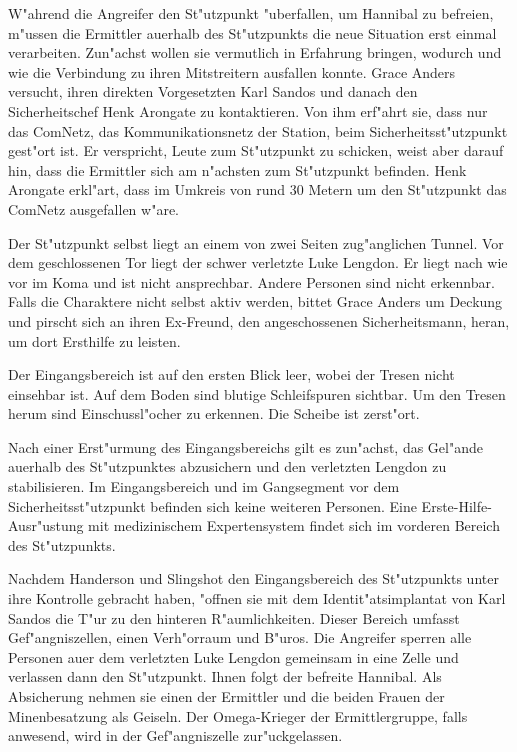 
W"ahrend die Angreifer den St"utzpunkt "uberfallen, um Hannibal zu befreien, m"ussen die Ermittler au\3erhalb des St"utzpunkts die neue Situation erst einmal verarbeiten. Zun"achst wollen sie vermutlich in Erfahrung bringen, wodurch und wie die Verbindung zu ihren Mitstreitern ausfallen konnte. Grace Anders versucht, ihren direkten Vorgesetzten Karl Sandos und danach den Sicherheitschef Henk Arongate zu kontaktieren. Von ihm erf"ahrt sie, dass nur das ComNetz, das Kommunikationsnetz der Station, beim Sicherheitsst"utzpunkt gest"ort ist. Er verspricht, Leute zum St"utzpunkt zu schicken, weist aber darauf hin, dass die Ermittler sich am n"achsten zum St"utzpunkt befinden. Henk Arongate erkl"art, dass im Umkreis von rund 30 Metern um den St"utzpunkt das ComNetz ausgefallen w"are.

Der St"utzpunkt selbst liegt an einem von zwei Seiten zug"anglichen Tunnel. Vor dem geschlossenen Tor liegt der schwer verletzte Luke Lengdon. Er liegt nach wie vor im Koma und ist nicht ansprechbar. Andere Personen sind nicht erkennbar. Falls die Charaktere nicht selbst aktiv werden, bittet Grace Anders um Deckung und pirscht sich an ihren Ex-Freund, den angeschossenen Sicherheitsmann, heran, um dort Ersthilfe zu leisten.

Der Eingangsbereich ist auf den ersten Blick leer, wobei der Tresen nicht einsehbar ist. Auf dem Boden sind blutige Schleifspuren sichtbar. Um den Tresen herum sind Einschussl"ocher zu erkennen. Die Scheibe ist zerst"ort. 

Nach einer Erst"urmung des Eingangsbereichs gilt es zun"achst, das Gel"ande au\3erhalb des St"utzpunktes abzusichern und den verletzten Lengdon zu stabilisieren. Im Eingangsbereich und im Gangsegment vor dem Sicherheitsst"utzpunkt befinden sich keine weiteren Personen. Eine Erste-Hilfe-Ausr"ustung mit medizinischem Expertensystem findet sich im vorderen Bereich des St"utzpunkts.


Nachdem Handerson und Slingshot den Eingangsbereich des St"utzpunkts unter ihre Kontrolle gebracht haben, "offnen sie mit dem Identit"atsimplantat von Karl Sandos die T"ur zu den hinteren R"aumlichkeiten. Dieser Bereich umfasst Gef"angniszellen, einen Verh"orraum und B"uros. Die Angreifer sperren alle Personen au\3er dem verletzten Luke Lengdon gemeinsam in eine Zelle und verlassen dann den St"utzpunkt. Ihnen folgt der befreite Hannibal. Als Absicherung nehmen sie einen der Ermittler und die beiden Frauen der Minenbesatzung als Geiseln. Der Omega-Krieger der Ermittlergruppe, falls anwesend, wird in der Gef"angniszelle zur"uckgelassen. 

